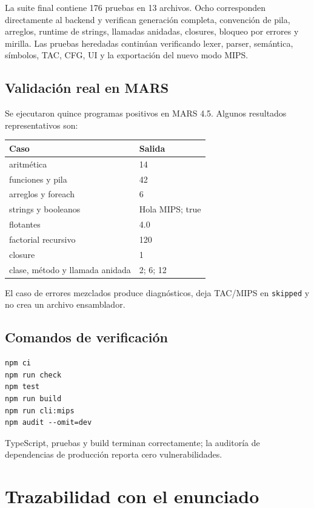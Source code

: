 \documentclass[11pt,letterpaper,oneside]{report}
\newcommand{\codigo}[1]{\texttt{#1}}
\begin{document}
La suite final contiene 176 pruebas en 13 archivos. Ocho corresponden directamente al backend y verifican generaci\'on completa, convenci\'on de pila, arreglos, runtime de strings, llamadas anidadas, closures, bloqueo por errores y mirilla. Las pruebas heredadas contin\'uan verificando lexer, parser, sem\'antica, s\'imbolos, TAC, CFG, UI y la exportaci\'on del nuevo modo MIPS.

\section{Validaci\'on real en MARS}

Se ejecutaron quince programas positivos en MARS 4.5. Algunos resultados representativos son:

\begin{longtable}{p{7cm}p{5cm}}
\toprule
Caso & Salida\\\midrule
aritm\'etica & 14\\
funciones y pila & 42\\
arreglos y foreach & 6\\
strings y booleanos & Hola MIPS; true\\
flotantes & 4.0\\
factorial recursivo & 120\\
closure & 1\\
clase, m\'etodo y llamada anidada & 2; 6; 12\\
\bottomrule
\end{longtable}

El caso de errores mezclados produce diagn\'osticos, deja TAC/MIPS en \codigo{skipped} y no crea un archivo ensamblador.

\section{Comandos de verificaci\'on}

\begin{verbatim}
npm ci
npm run check
npm test
npm run build
npm run cli:mips
npm audit --omit=dev
\end{verbatim}

TypeScript, pruebas y build terminan correctamente; la auditor\'ia de dependencias de producci\'on reporta cero vulnerabilidades.

\chapter{Trazabilidad con el enunciado}
\end{document}
